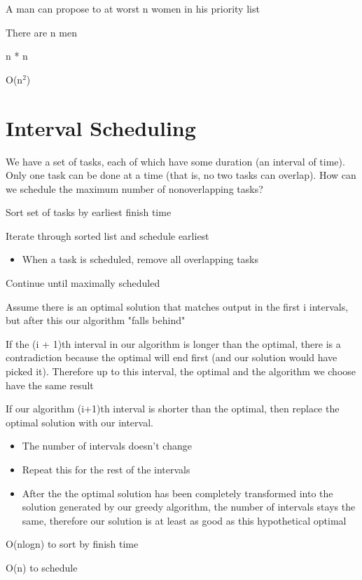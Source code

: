 {
    \item A man can propose to at worst n women in his priority list
    \item There are n men
    \item n * n
    \item O(n$^{2}$)
}

\section{Interval Scheduling}
We have a set of tasks, each of which have some duration (an interval of time). Only one task can be done at a time (that is, no two tasks can overlap). How can we schedule the maximum number of nonoverlapping tasks?

\algorithm
{
    \item Sort set of tasks by earliest finish time
    \item Iterate through sorted list and schedule earliest
    \begin {itemize}
        \item When a task is scheduled, remove all overlapping tasks
    \end{itemize}
    \item Continue until maximally scheduled
}
{
    \item Assume there is an optimal solution that matches output in the first i intervals, but after this our algorithm "falls behind"
    \item If the (i + 1)th interval in our algorithm is longer than the optimal, there is a contradiction because the optimal will end first (and our solution would have picked it). Therefore up to this interval, the optimal and the algorithm we choose have the same result
    \item If our algorithm (i+1)th interval is shorter than the optimal, then replace the optimal solution with our interval. 
    \begin{itemize}
        \item The number of intervals doesn't change
        \item Repeat this for the rest of the intervals
        \item After the the optimal solution has been completely transformed into the solution generated by our greedy algorithm, the number of intervals stays the same, therefore our solution is at least as good as this hypothetical optimal

    \end{itemize}
}
{
    \item O(nlogn) to sort by finish time
    \item O(n) to schedule 
    
}


